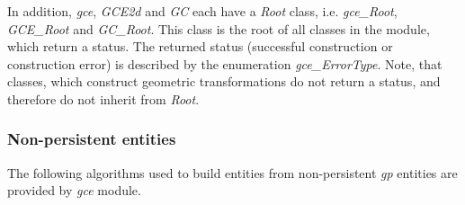 In addition, {\itshape gce}, {\itshape G\+C\+E2d} and {\itshape GC} each have a {\itshape Root} class, i.\+e. {\itshape gce\+\_\+\+Root}, {\itshape G\+C\+E\+\_\+\+Root} and {\itshape G\+C\+\_\+\+Root}. This class is the root of all classes in the module, which return a status. The returned status (successful construction or construction error) is described by the enumeration {\itshape gce\+\_\+\+Error\+Type}. Note, that classes, which construct geometric transformations do not return a status, and therefore do not inherit from {\itshape Root}.\hypertarget{occt_user_guides__modeling_data_occt_modat_1_2_1}{}\subsubsection{Non-\/persistent entities}\label{occt_user_guides__modeling_data_occt_modat_1_2_1}
The following algorithms used to build entities from non-\/persistent {\itshape gp} entities are provided by {\itshape gce} module.
